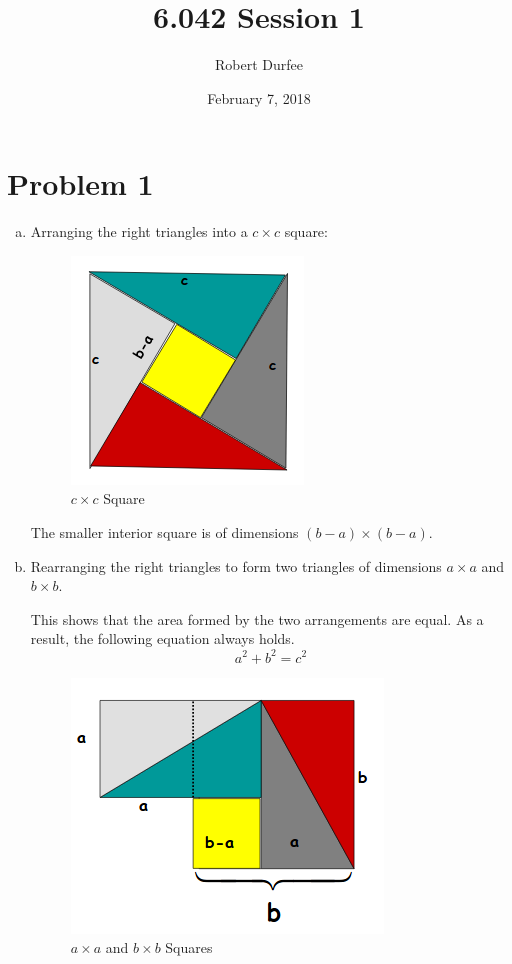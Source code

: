 \documentclass{article}
\title{ 6.042 Session 1 }
\author{ Robert Durfee }
\date{ February 7, 2018 }
\begin{document}
\maketitle

\section*{ Problem 1 }

\begin{enumerate}[a.]
  \item Arranging the right triangles into a $c \times c$ square:

    \begin{figure}[H]
      \centering
      \includegraphics[scale=0.80]{"CByCSquare"}
      \caption{$c \times c$ Square}
    \end{figure}

    The smaller interior square is of dimensions $(b-a) \times (b-a)$.

  \item Rearranging the right triangles to form two triangles of dimensions $a
    \times a$ and $b \times b$.

    \bigbreak

    This shows that the area formed by the two
    arrangements are equal. As a result, the following equation always holds.
    $$ a^{2} + b^{2} = c^{2} $$

    \begin{figure}[H]
      \centering
      \includegraphics[scale=0.80]{"BByBAndAByASquare"}
      \caption{$a \times a$ and $b \times b$ Squares}
    \end{figure}


\end{enumerate}
\end{document}
